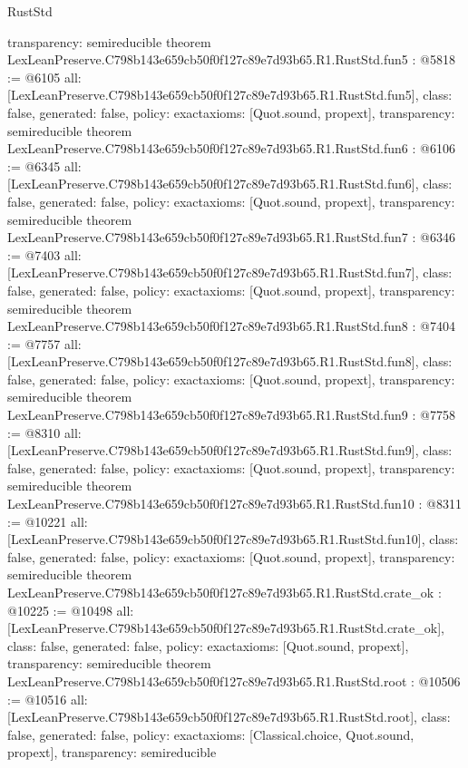 \begin{lexlean}{RustStd}
\begin{coremodule}
{  transparency: semireducible
}
theorem LexLeanPreserve.C798b143e659cb50f0f127c89e7d93b65.R1.RustStd.fun5 : @5818 := @6105 {
  all: [LexLeanPreserve.C798b143e659cb50f0f127c89e7d93b65.R1.RustStd.fun5],
  class: false,
  generated: false,
  policy: exact{axioms: [Quot.sound, propext]},
  transparency: semireducible
}
theorem LexLeanPreserve.C798b143e659cb50f0f127c89e7d93b65.R1.RustStd.fun6 : @6106 := @6345 {
  all: [LexLeanPreserve.C798b143e659cb50f0f127c89e7d93b65.R1.RustStd.fun6],
  class: false,
  generated: false,
  policy: exact{axioms: [Quot.sound, propext]},
  transparency: semireducible
}
theorem LexLeanPreserve.C798b143e659cb50f0f127c89e7d93b65.R1.RustStd.fun7 : @6346 := @7403 {
  all: [LexLeanPreserve.C798b143e659cb50f0f127c89e7d93b65.R1.RustStd.fun7],
  class: false,
  generated: false,
  policy: exact{axioms: [Quot.sound, propext]},
  transparency: semireducible
}
theorem LexLeanPreserve.C798b143e659cb50f0f127c89e7d93b65.R1.RustStd.fun8 : @7404 := @7757 {
  all: [LexLeanPreserve.C798b143e659cb50f0f127c89e7d93b65.R1.RustStd.fun8],
  class: false,
  generated: false,
  policy: exact{axioms: [Quot.sound, propext]},
  transparency: semireducible
}
theorem LexLeanPreserve.C798b143e659cb50f0f127c89e7d93b65.R1.RustStd.fun9 : @7758 := @8310 {
  all: [LexLeanPreserve.C798b143e659cb50f0f127c89e7d93b65.R1.RustStd.fun9],
  class: false,
  generated: false,
  policy: exact{axioms: [Quot.sound, propext]},
  transparency: semireducible
}
theorem LexLeanPreserve.C798b143e659cb50f0f127c89e7d93b65.R1.RustStd.fun10 : @8311 := @10221 {
  all: [LexLeanPreserve.C798b143e659cb50f0f127c89e7d93b65.R1.RustStd.fun10],
  class: false,
  generated: false,
  policy: exact{axioms: [Quot.sound, propext]},
  transparency: semireducible
}
theorem LexLeanPreserve.C798b143e659cb50f0f127c89e7d93b65.R1.RustStd.crate_ok : @10225 := @10498 {
  all: [LexLeanPreserve.C798b143e659cb50f0f127c89e7d93b65.R1.RustStd.crate_ok],
  class: false,
  generated: false,
  policy: exact{axioms: [Quot.sound, propext]},
  transparency: semireducible
}
theorem LexLeanPreserve.C798b143e659cb50f0f127c89e7d93b65.R1.RustStd.root : @10506 := @10516 {
  all: [LexLeanPreserve.C798b143e659cb50f0f127c89e7d93b65.R1.RustStd.root],
  class: false,
  generated: false,
  policy: exact{axioms: [Classical.choice, Quot.sound, propext]},
  transparency: semireducible
}


\end{coremodule}
\end{lexlean}
